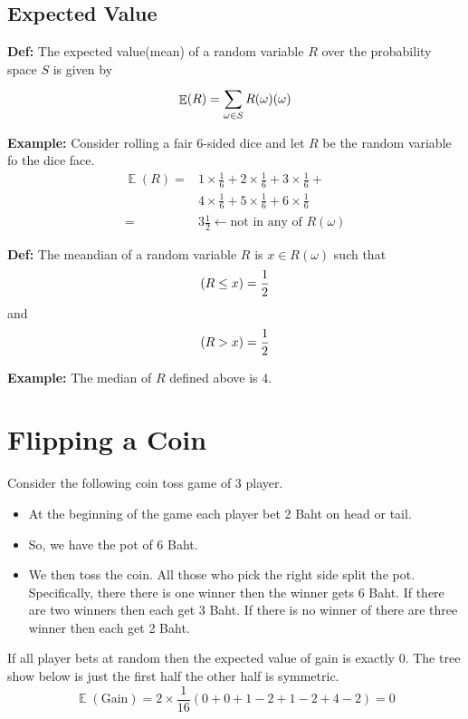 \documentclass[a4paper, 12pt]{article}
\newcommand{\half}{\ensuremath{\frac{1}{2}}}
\newcommand{\definition}{\vspace{1em}\noindent\textbf{Def:} }
\newcommand{\example}{\vspace{1em}\noindent\textbf{Example:} }
\let\Pr\relax
\DeclareMathOperator{\Pr}{Pr}
\DeclareMathOperator{\E}{\mathbb{E}}
\begin{document}
\begin{multicols}{2}
\section*{Expected Value}

\definition The expected value(mean) of a random variable $R$ over the probability space $S$ is given by
\[
	\E(R) = \sum_{\omega \in S}^{} R(\omega) \Pr(\omega)
\]

\example Consider rolling a fair 6-sided dice and let $R$ be the random variable fo the dice face.
\begin{align*}
	\E(R) =& 1\times\frac{1}{6} + 2 \times \frac{1}{6} + 3 \times\frac{1}{6}+\\
	&4\times\frac{1}{6} + 5 \times \frac{1}{6} + 6 \times\frac{1}{6}\\
	=& 3 \frac{1}{2} \leftarrow \text{not in any of $R(\omega)$}
\end{align*}

\definition The meandian of a random variable $R$ is $x\in R(\omega)$ such that
\[
	\Pr(R\le x) =\half
\]
and
\[
\Pr(R>x) =\half
\]

\example The median of $R$ defined above is $4$.
\end{multicols}
\section*{Flipping a Coin}

Consider the following coin toss game of 3 player.
\begin{itemize}
	\item At the beginning of the game each player bet 2 Baht on head or tail.
	\item So, we have the pot of 6 Baht.
	\item We then toss the coin. All those who pick the right side split the pot. Specifically, there there is one winner then the winner gets 6 Baht. If there are two winners then each get 3 Baht. If there is no winner of there are three winner then each get 2 Baht.
\end{itemize}

If all player bets at random then the expected value of gain is exactly 0. The tree show below is just the first half the other half is symmetric.
\[
	\E(\text{Gain}) = 2\times \frac{1}{16}(0+0+1-2+1-2+4-2) = 0
\]
\end{document}
